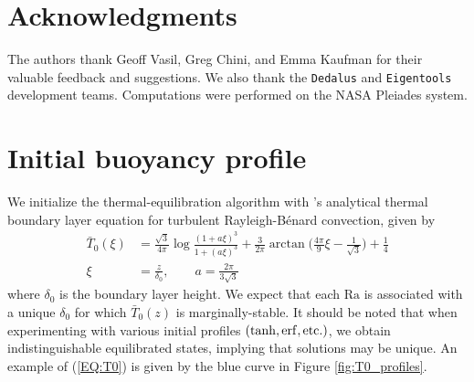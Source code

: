 \documentclass[reprint,amsmath,amssymb,aps]{revtex4-1}
\newcommand\Ra{\mathrm{Ra}}
\newcommand{\eq}[1]{(\ref{#1})}
\begin{document}
\section*{Acknowledgments}
The authors thank Geoff Vasil, Greg Chini, and Emma Kaufman for their valuable feedback and suggestions. 
We also thank the \texttt{Dedalus} and \texttt{Eigentools} development teams. 
Computations were performed on the NASA Pleiades system.


\appendix

\section{Initial buoyancy profile} \label{sec:initial_profile}
We initialize the thermal-equilibration algorithm with \cite{Shishkina}'s analytical thermal boundary layer equation for turbulent Rayleigh-B\'enard convection, given by 
\begin{align}
    \bar{T}_0(\xi) &= \frac{\sqrt{3}}{4\pi} \log \frac{(1 + a\xi)^3}{1 + (a\xi)^3} + \frac{3}{2\pi} \arctan \Big( \frac{4\pi}{9}\xi - \frac{1}{\sqrt{3}} \Big) + \frac{1}{4} \nonumber \\
    \xi &= \frac{z}{\delta_0}, \qquad a = \frac{2\pi}{3\sqrt{3}}\label{EQ:T0}
\end{align}
where $\delta_0$ is the boundary layer height. 
We expect that each $\Ra$ is associated with a unique $\delta_0$ for which $\bar{T}_0(z)$ is marginally-stable. 
It should be noted that when experimenting with various initial profiles $(\tanh, \rm{erf}, \rm{etc.})$, we obtain indistinguishable equilibrated states, implying that solutions may be unique. 
An example of \eq{EQ:T0} is given by the blue curve in Figure \ref{fig:T0_profiles}.

\end{document}
